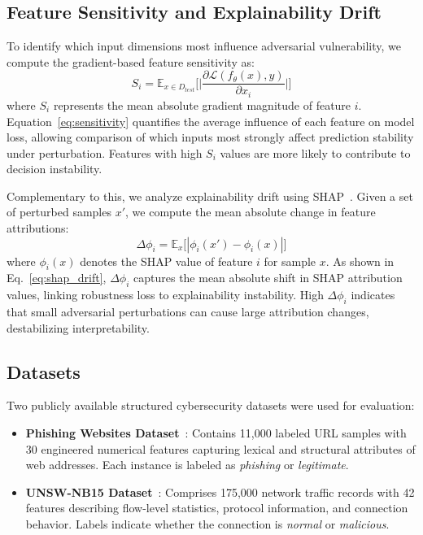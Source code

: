 \documentclass[a4paper,twoside]{article}
\begin{document}
\subsection{Feature Sensitivity and Explainability Drift}

To identify which input dimensions most influence adversarial vulnerability, 
we compute the gradient-based feature sensitivity as:
\begin{equation}
S_i = \mathbb{E}_{x \in D_{test}} \Big[ \Big|\frac{\partial \mathcal{L}(f_\theta(x), y)}{\partial x_i}\Big| \Big]
\label{eq:sensitivity}
\end{equation}
where $S_i$ represents the mean absolute gradient magnitude of feature $i$. 
Equation~\ref{eq:sensitivity} quantifies the average influence of each feature 
on model loss, allowing comparison of which inputs most strongly affect 
prediction stability under perturbation.
Features with high $S_i$ values are more likely to contribute to decision instability.

Complementary to this, we analyze explainability drift using SHAP~\cite{lundberg2017unified}. 
Given a set of perturbed samples $x'$, we compute the mean absolute change in feature attributions:
\begin{equation}
\Delta \phi_i = \mathbb{E}_{x} \big[ |\phi_i(x') - \phi_i(x)| \big]
\label{eq:shap_drift}
\end{equation}
where $\phi_i(x)$ denotes the SHAP value of feature $i$ for sample $x$. 
As shown in Eq.~\ref{eq:shap_drift}, $\Delta \phi_i$ captures the mean absolute shift 
in SHAP attribution values, linking robustness loss to explainability instability. 
High $\Delta \phi_i$ indicates that small adversarial perturbations can cause 
large attribution changes, destabilizing interpretability.

\subsection{Datasets}

Two publicly available structured cybersecurity datasets were used for evaluation:

\begin{itemize}
    \item \textbf{Phishing Websites Dataset}~\cite{phishing_kaggle}: 
    Contains 11,000 labeled URL samples with 30 engineered numerical features capturing 
    lexical and structural attributes of web addresses. 
    Each instance is labeled as \textit{phishing} or \textit{legitimate}.
    
    \item \textbf{UNSW-NB15 Dataset}~\cite{unsw_kaggle,moustafa2015unsw}: 
    Comprises 175,000 network traffic records with 42 features describing flow-level statistics, 
    protocol information, and connection behavior. 
    Labels indicate whether the connection is \textit{normal} or \textit{malicious}.
\end{itemize}
\end{document}
